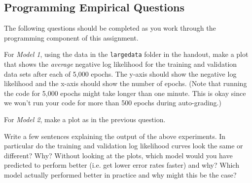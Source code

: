 \documentclass[11pt,addpoints,answers]{exam}
\begin{document}
\clearpage


\subsection{Programming Empirical Questions}
\label{sec:empirical}

The following questions should be completed as you work through the programming component of this assignment.

\begin{questions}
\question[2]
For \emph{Model 1}, using the data in the \texttt{largedata} folder in the handout, make a plot that shows the \textit{average} negative log likelihood for the training and validation data sets after each of 5,000 epochs. The y-axis should show the negative log likelihood and the x-axis should show the number of epochs. (Note that running the code for 5,000 epochs might take longer than one minute. This is okay since we won't run your code for more than 500 epochs during auto-grading.)


\begin{your_solution}[height=8cm]
\texttt{[image: \{../code/plots/train\_v\_val\_m1.png]}}
\end{your_solution}
    

\question[2]
For \emph{Model 2}, make a plot as in the previous question.

\begin{your_solution}[height=8cm]
\texttt{[image: \{../code/plots/train\_v\_val\_m2.png]}}
\end{your_solution}

    

\clearpage

\question[2]
Write a few sentences explaining the output of the above experiments. In particular do the training and validation log likelihood curves look the same or different? Why?
Without looking at the plots, which model would you have predicted to perform better (i.e. get lower error rates faster) and why? Which model actually performed better in practice and why might this be the case? 


\end{questions}
\end{document}
